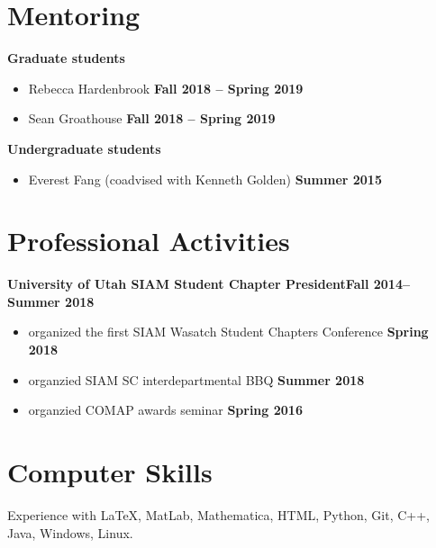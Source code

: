 \documentclass[margin,line]{res}
\begin{document}
\begin{resume}
\section{\sc Mentoring}
{\bf Graduate students}
\begin{itemize}
\item[] Rebecca Hardenbrook
\hfill {\bf Fall 2018 -- Spring 2019}
\item[] Sean Groathouse
\hfill {\bf Fall 2018 -- Spring 2019}
\end{itemize}
{\bf Undergraduate students}
\begin{itemize}
\item[] Everest Fang (coadvised with Kenneth Golden)
\hfill {\bf Summer 2015}
\end{itemize}

\section{\sc Professional Activities}
{\bf University of Utah SIAM Student Chapter President}\hfill{\bf Fall 2014--Summer 2018}\\
\begin{itemize}
\item[] organized the first SIAM Wasatch Student Chapters Conference
\hfill {\bf Spring 2018}
\item[] organzied SIAM SC interdepartmental BBQ
\hfill {\bf Summer 2018}
\item[] organzied COMAP awards seminar
\hfill {\bf Spring 2016}
\end{itemize}

\section{\sc Computer Skills} 
Experience with \LaTeX, MatLab, Mathematica, HTML, Python, Git, C++, Java, Windows, Linux.


\end{resume}
\end{document}
